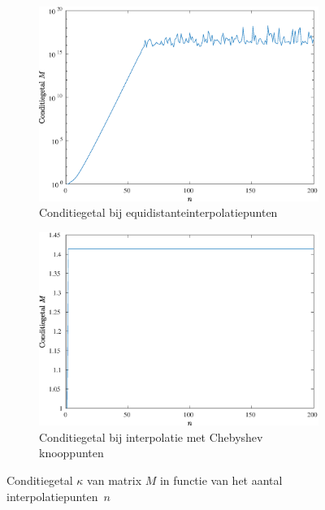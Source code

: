 \documentclass[a4paper, 12pt, titlepage, fleqn]{article}
\begin{document}
\begin{figure}
\begin{subfigure}[b]{0.45\textwidth}
\includegraphics[width=\linewidth]{../Afbeeldingen/runge_equi_kappa.eps}
\caption{Conditiegetal bij equidistanteinterpolatiepunten}
\end{subfigure}
\hfill
\begin{subfigure}[b]{0.45\textwidth}
\includegraphics[width=\linewidth]{../Afbeeldingen/runge_nul_kappa.eps}
\caption{Conditiegetal bij interpolatie met Chebyshev knooppunten}
\end{subfigure}
\caption{Conditiegetal $\kappa$ van matrix $M$ in functie van het aantal interpolatiepunten~$n$}
\label{fig:kappa}
\end{figure}
\end{document}
